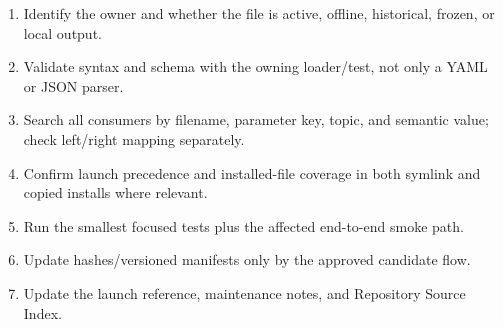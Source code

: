 \begin{procedurebox}
\begin{enumerate}
  \item Identify the owner and whether the file is active, offline, historical,
        frozen, or local output.
  \item Validate syntax and schema with the owning loader/test, not only a YAML
        or JSON parser.
  \item Search all consumers by filename, parameter key, topic, and semantic
        value; check left/right mapping separately.
  \item Confirm launch precedence and installed-file coverage in both symlink
        and copied installs where relevant.
  \item Run the smallest focused tests plus the affected end-to-end smoke path.
  \item Update hashes/versioned manifests only by the approved candidate flow.
  \item Update the launch reference, maintenance notes, and Repository Source
        Index.
\end{enumerate}
\end{procedurebox}
